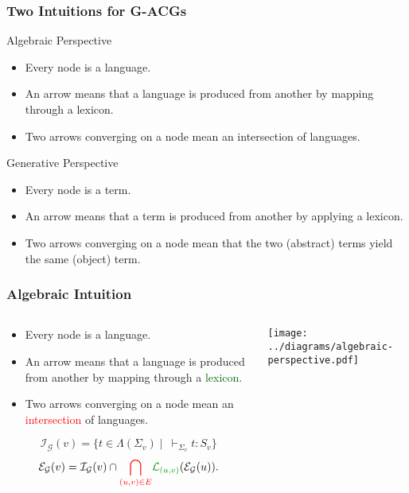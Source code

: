 \documentclass{beamer}
\begin{document}
\begin{frame}
  \frametitle{Two Intuitions for G-ACGs}

  \begin{block}{Algebraic Perspective}
    \begin{itemize}
    \item Every node is a language.
    \item An arrow means that a language is produced from another by
      mapping through a lexicon.
    \item Two arrows converging on a node mean an intersection of
      languages.
    \end{itemize}
  \end{block}
  \begin{block}{Generative Perspective}
    \begin{itemize}
    \item Every node is a term.
    \item An arrow means that a term is produced from another by
      applying a lexicon.
    \item Two arrows converging on a node mean that the two (abstract)
      terms yield the same (object) term.
    \end{itemize}
  \end{block}
\end{frame}


\begin{frame}
  \frametitle{Algebraic Intuition}

  \begin{columns}[c]
    \begin{column}{0.7\textwidth}
      \begin{itemize}
      \item Every node is a language.
      \item An arrow means that a language is produced from another by
        mapping through a \textcolor{darkgreen}{lexicon}.
      \item Two arrows converging on a node mean an
        \textcolor{red}{intersection} of languages.
      \end{itemize}

$$
\mathcal{I}_{\mathcal{G}}(v) = \{t \in \Lambda(\Sigma_v)
\mid\ \vdash_{\Sigma_v} t : S_v\}
$$
$$
\mathcal{E}_{\mathcal{G}}(v) = \mathcal{I}_{\mathcal{G}}(v) \cap
\textcolor{red}{\bigcap_{(u,v) \in E}}
\textcolor{darkgreen}{\mathcal{L}_{(u,v)}}(\mathcal{E}_{\mathcal{G}}(u)).
$$
    \end{column}
    \begin{column}{0.3\textwidth}
      \texttt{[image: ../diagrams/algebraic-perspective.pdf]}
    \end{column}
  \end{columns}

\end{frame}
\end{document}
